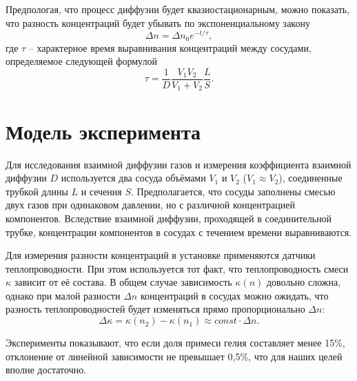 \documentclass{article}
\begin{document}
    Предпологая, что процесс диффузии будет квазиостационарным, можно показать, что разность концентраций будет убывать по экспоненциальному закону
    \begin{equation}
        \label{Delta_n}
        \Delta n = \Delta n_0 e^{-t / \tau},
    \end{equation}
    где $\tau$ -- характерное время выравнивания концентраций между сосудами, определяемое следующей формулой
    \begin{equation}
        \label{Tau}
        \tau = \frac{1}{D} \frac{V_1V_2}{V_1 + V_2} \frac{L}{S}.
    \end{equation}

\section{Модель эксперимента}
    Для   исследования   взаимной диффузии газов и измерения коэффициента взаимной диффузии  $D$  используется  два сосуда  объёмами  $V_1$ и $V_2$ ($V_1 \approx V_2$), соединенные трубкой длины $L$ и сечения  $S$. Предполагается, что сосуды заполнены смесью двух газов при одинаковом давлении, но с различной концентрацией компонентов. Вследствие взаимной диффузии, проходящей в   соединительной трубке, концентрации компонентов в сосудах с течением времени выравниваются.

    Для измерения разности  концентраций  в установке применяются датчики теплопроводности. При этом используется тот факт, что теплопроводность смеси $\kappa$ зависит от её состава. В общем случае   зависимость  $\kappa (n)$  довольно   сложна,   однако   при   малой   разности  $\Delta n$ концентраций в сосудах можно ожидать, что разность теплопроводностей будет изменяться прямо пропорционально $\Delta n:$
    \begin{equation*}
        \Delta \kappa = \kappa (n_2) - \kappa (n_1) \approx const \cdot \Delta n.
    \end{equation*}

    Эксперименты показывают, что если доля примеси гелия составляет менее 15\%, отклонение от линейной зависимости не превышает 0,5\%, что для наших целей вполне достаточно.
\end{document}
